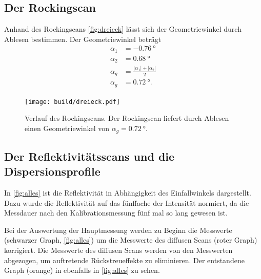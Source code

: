 \subsection*{Der Rockingscan}

Anhand des Rockingscans \autoref{fig:dreieck} lässt sich der Geometriewinkel durch Ablesen bestimmen.
Der Geometriewinkel beträgt
\begin{align*}
    \alpha_1 &= \SI{-0.76}{\degree}\\    
    \alpha_2 &= \SI{0.68}{\degree}\\    
    \alpha_g &= \frac{|\alpha_1|+|\alpha_2|}{2}\\
    \alpha_g &= \SI{0.72}{\degree}.    
\end{align*}
\begin{figure}
    \centering
    \texttt{[image: build/dreieck.pdf]}
    \caption{Verlauf des Rockingscans. Der Rockingscan liefert durch Ablesen einen Geometriewinkel von $\alpha_g = \SI{0.72}{\degree}$.}
    \label{fig:dreieck}
\end{figure}

\subsection{Der Reflektivitätsscans und die Dispersionsprofile}
In \autoref{fig:alles} ist die Reflektivität in Abhängigkeit des Einfallwinkels dargestellt.
Dazu wurde die Reflektivität auf das fünffache der Intensität normiert, da die Messdauer nach den Kalibrationsmessung fünf mal so lang gewesen ist. 

Bei der Auswertung der Hauptmessung werden zu Beginn die Messwerte (schwarzer Graph, \autoref{fig:alles}) um die Messwerte des
diffusen Scans (roter Graph) korrigiert. Die Messwerte des diffusen Scans werden von den Messwerten abgezogen, um auftretende Rückstreueffekte zu 
eliminieren. Der entstandene Graph (orange) in ebenfalls in \autoref{fig:alles} zu sehen. 

